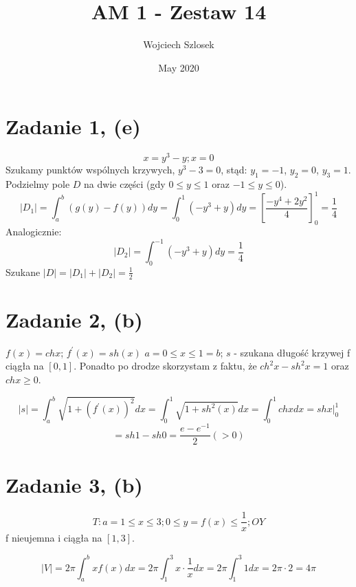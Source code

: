 \documentclass{article}
\title{AM 1 - Zestaw 14}
\author{Wojciech Szlosek}
\date{May 2020}
\begin{document}
\maketitle

\section{Zadanie 1, (e)}

$$x = y^3 -y; x = 0$$
Szukamy punktów wspólnych krzywych, $y^3 - 3 = 0$, stąd: $y_1 = -1$, $y_2 = 0$, $y_3 = 1$.
Podzielmy pole $D$ na dwie części (gdy $0 \leq y \leq 1$ oraz $-1 \leq y \leq 0$).
$$|D_1| = \int_{a}^{b} (g(y)-f(y))dy = \int_{0}^{1} (-y^3 +y) dy = [\frac{-y^4 +2y^2}{4}]_{0}^{1} = \frac{1}{4}$$
Analogicznie:
$$|D_2| = \int_{0}^{-1} (-y^3 +y) dy = \frac{1}{4}$$
Szukane $|D| = |D_1| + |D_2| = \frac{1}{2}$

\section{Zadanie 2, (b)}

$f(x) = ch x$; $f^{'}(x) = sh(x) $ $a = 0 \leq x \leq 1 = b$; $s$ - szukana długość krzywej \newline
f ciągła na $[0,1]$.
Ponadto po drodze skorzystam z faktu, że $ch^{2} x - sh^{2} x = 1$ oraz $ ch x \geq 0$.

$$|s| = \int_{a}^{b} \sqrt{1+(f^{'}(x))^{2}} dx = \int_{0}^{1} \sqrt{1+sh^2(x)} dx = \int_{0}^{1} ch x dx = sh x |_{0}^{1}$$
$$ = sh 1 - sh 0 = \frac{e - e^{-1}}{2} (>0)$$

\section{Zadanie 3, (b)}

$$T: a = 1 \leq x \leq 3; 0 \leq y = f(x) \leq \frac{1}{x}; OY$$
f nieujemna i ciągła na $[1,3]$.

$$|V| = 2\pi \int_{a}^{b} xf(x)dx = 2\pi \int_{1}^{3} x \cdot \frac{1}{x} dx = 2\pi \int_{1}^{3} 1 dx = 2\pi \cdot 2 = 4\pi$$
\end{document}
